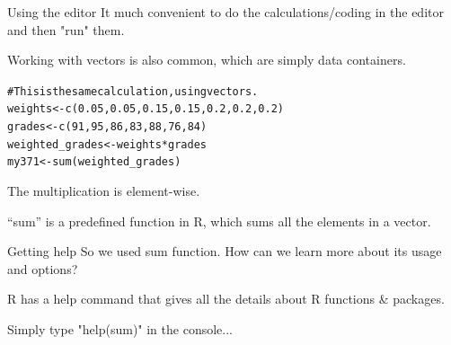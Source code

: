 \documentclass{beamer}\usepackage[]{graphicx}\usepackage[]{color}
\makeatletter
\newcommand{\hlnum}[1]{\textcolor[rgb]{0.824,0.412,0.118}{#1}}%
\newcommand{\hlcom}[1]{\textcolor[rgb]{0.824,0.706,0.549}{#1}}%
\newcommand{\hlopt}[1]{\textcolor[rgb]{1,0.894,0.769}{#1}}%
\newcommand{\hlstd}[1]{\textcolor[rgb]{1,0.894,0.769}{#1}}%
\newcommand{\hlkwb}[1]{\textcolor[rgb]{0.804,0.776,0.451}{#1}}%
\newcommand{\hlkwd}[1]{\textcolor[rgb]{1,0.78,0.769}{#1}}%
\newenvironment{kframe}{%
 \def\at@end@of@kframe{}%
 \ifinner\ifhmode%
  \def\at@end@of@kframe{\end{minipage}}%
  \begin{minipage}{\columnwidth}%
 \fi\fi%
 \def\FrameCommand##1{\hskip\@totalleftmargin \hskip-\fboxsep
 \colorbox{shadecolor}{##1}\hskip-\fboxsep
     \hskip-\linewidth \hskip-\@totalleftmargin \hskip\columnwidth}%
 \MakeFramed {\advance\hsize-\width
   \@totalleftmargin\z@ \linewidth\hsize
   \@setminipage}}%
 {\par\unskip\endMakeFramed%
 \at@end@of@kframe}
\newenvironment{knitrout}{}{} %
\makeatother
\begin{document}
\begin{darkframes}
    \begin{frame}[fragile]{Using the editor}
      \fontsize{10}{10}\selectfont
      It much convenient to do the calculations/coding in the editor and then "run" them. \pause
      
      Working with vectors is also common, which are simply data containers.

\begin{knitrout}
\begin{kframe}
\begin{alltt}
\hlcom{# This is the same calculation, using vectors.}
\hlstd{weights} \hlkwb{<-} \hlkwd{c}\hlstd{(}\hlnum{0.05}\hlstd{,} \hlnum{0.05}\hlstd{,} \hlnum{0.15}\hlstd{,} \hlnum{0.15}\hlstd{,} \hlnum{0.2}\hlstd{,} \hlnum{0.2}\hlstd{,} \hlnum{0.2}\hlstd{)}
\hlstd{grades} \hlkwb{<-} \hlkwd{c}\hlstd{(}\hlnum{91}\hlstd{,} \hlnum{95}\hlstd{,} \hlnum{86}\hlstd{,} \hlnum{83}\hlstd{,} \hlnum{88}\hlstd{,} \hlnum{76}\hlstd{,} \hlnum{84}\hlstd{)}
\hlstd{weighted_grades} \hlkwb{<-} \hlstd{weights} \hlopt{*} \hlstd{grades}
\hlstd{my371} \hlkwb{<-} \hlkwd{sum}\hlstd{(weighted_grades)}
\end{alltt}
\end{kframe}
\end{knitrout}
      The multiplication is element-wise. \pause
      
      ``sum'' is a predefined function in R, which sums all the elements in a vector.
  

    \end{frame}
    
    
    
    \begin{frame}[fragile]{Getting help}
      \fontsize{10}{10}\selectfont
      So we used sum function. How can we learn more about its usage and options? \pause
      \bigskip
      
      R has a help command that gives all the details about R functions & packages. \pause
      
      \bigskip
      Simply type "help(sum)" in the console...
    
    
    \end{frame}
    
    
    

  \end{darkframes}
\end{document}
